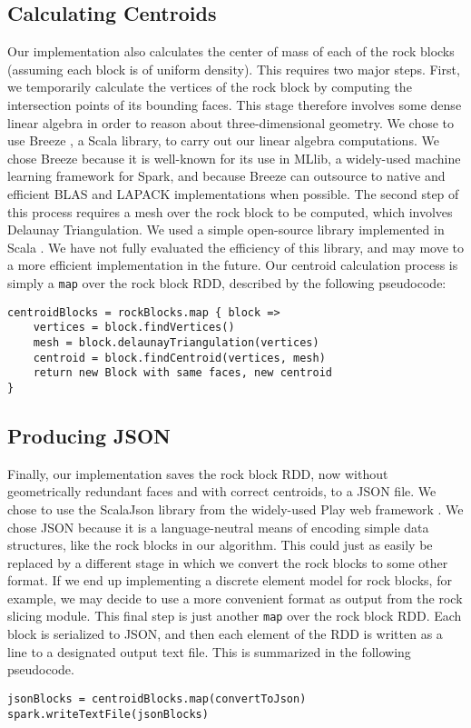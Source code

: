 \subsection{Calculating Centroids}
Our implementation also calculates the center of mass of each of the rock blocks (assuming each block is of uniform density). This requires two major steps. First, we temporarily calculate the vertices of the rock block by computing the intersection points of its bounding faces. This stage therefore involves some dense linear algebra in order to reason about three-dimensional geometry. We chose to use Breeze \cite{breeze}, a Scala library, to carry out our linear algebra computations. We chose Breeze because it is well-known for its use in MLlib, a widely-used machine learning framework for Spark, and because Breeze can outsource to native and efficient BLAS and LAPACK implementations when possible. The second step of this process requires a mesh over the rock block to be computed, which involves Delaunay Triangulation. We used a simple open-source library implemented in Scala \cite{delaunay}. We have not fully evaluated the efficiency of this library, and may move to a more efficient implementation in the future. Our centroid calculation process is simply a \texttt{map} over the rock block RDD, described by the following pseudocode:
\begin{verbatim}
centroidBlocks = rockBlocks.map { block =>
    vertices = block.findVertices()
    mesh = block.delaunayTriangulation(vertices)
    centroid = block.findCentroid(vertices, mesh)
    return new Block with same faces, new centroid
}
\end{verbatim}

\subsection{Producing JSON}
Finally, our implementation saves the rock block RDD, now without geometrically redundant faces and with correct centroids, to a JSON file. We chose to use the ScalaJson library from the widely-used Play web framework \cite{play}. We chose JSON because it is a language-neutral means of encoding simple data structures, like the rock blocks in our algorithm. This could just as easily be replaced by a different stage in which we convert the rock blocks to some other format. If we end up implementing a discrete element model for rock blocks, for example, we may decide to use a more convenient format as output from the rock slicing module. This final step is just another \texttt{map} over the rock block RDD. Each block is serialized to JSON, and then each element of the RDD is written as a line to a designated output text file. This is summarized in the following pseudocode.
\begin{verbatim}
jsonBlocks = centroidBlocks.map(convertToJson)
spark.writeTextFile(jsonBlocks)
\end{verbatim}


